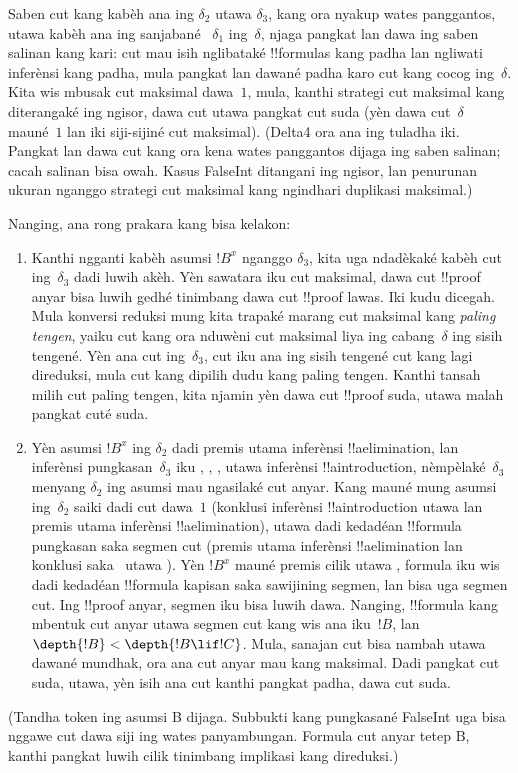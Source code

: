 \documentclass[../../../include/open-logic-section]{subfiles}
\begin{document}
Saben cut kang kabèh ana ing $\delta_2$ utawa $\delta_3$,
kang ora nyakup wates panggantos, utawa kabèh ana ing sanjabané
~$\delta_1$ ing~$\delta$, njaga pangkat lan dawa ing saben salinan kang kari:
cut mau isih nglibataké !!{formula}s kang padha lan ngliwati
inferènsi kang padha, mula pangkat lan dawané padha karo cut
kang cocog ing~$\delta$. Kita wis mbusak cut maksimal dawa~$1$,
mula, kanthi strategi cut maksimal kang diterangaké ing ngisor,
dawa cut utawa pangkat cut suda (yèn dawa cut~$\delta$
mauné~$1$ lan iki siji-sijiné cut maksimal).
(Delta4 ora ana ing tuladha iki. Pangkat lan dawa cut kang ora kena wates panggantos dijaga ing saben salinan; cacah salinan bisa owah. Kasus FalseInt ditangani ing ngisor, lan penurunan ukuran nganggo strategi cut maksimal kang ngindhari duplikasi maksimal.)

Nanging, ana rong prakara kang bisa kelakon:
\begin{enumerate}
  \item Kanthi ngganti kabèh asumsi $!B^x$ nganggo $\delta_3$,
  kita uga ndadèkaké kabèh cut ing~$\delta_3$ dadi luwih akèh.
  Yèn sawatara iku cut maksimal, dawa cut !!{proof} anyar bisa
  luwih gedhé tinimbang dawa cut !!{proof} lawas. Iki kudu
  dicegah. Mula konversi reduksi mung kita trapaké marang cut
  maksimal kang \emph{paling tengen}, yaiku cut kang ora nduwèni
  cut maksimal liya ing cabang~$\delta$ ing sisih tengené.
  Yèn ana cut ing~$\delta_3$, cut iku ana ing sisih tengené
  cut kang lagi direduksi, mula cut kang dipilih dudu kang paling
  tengen. Kanthi tansah milih cut paling tengen, kita njamin
  yèn dawa cut !!{proof} suda, utawa malah pangkat cuté suda.
  \item Yèn asumsi $!B^x$ ing $\delta_2$ dadi premis utama
  inferènsi !!a{elimination}, lan inferènsi pungkasan~$\delta_3$
  iku \Elim{\lor}, \Elim{\lexists}, \FalseInt, utawa inferènsi
  !!a{introduction}, nèmpèlaké~$\delta_3$ menyang $\delta_2$
  ing asumsi mau ngasilaké cut anyar. Kang mauné mung asumsi
  ing~$\delta_2$ saiki dadi cut dawa~$1$ (konklusi inferènsi
  !!a{introduction} utawa \FalseInt lan premis utama inferènsi
  !!a{elimination}), utawa dadi kedadéan !!{formula} pungkasan
  saka segmen cut (premis utama inferènsi !!a{elimination}
  lan konklusi saka~\Elim{\lor} utawa \Elim{\lexists}).
  Yèn $!B^x$ mauné premis cilik \Elim{\lor} utawa
  \Elim{\lexists}, formula iku wis dadi kedadéan !!{formula}
  kapisan saka sawijining segmen, lan bisa uga segmen cut.
  Ing !!{proof} anyar, segmen iku bisa luwih dawa. Nanging,
  !!{formula} kang mbentuk cut anyar utawa segmen cut kang wis
  ana iku~$!B$, lan $\depth{!B} < \depth{!B \lif !C}$.
  Mula, sanajan cut bisa nambah utawa dawané mundhak,
  ora ana cut anyar mau kang maksimal. Dadi pangkat cut suda,
  utawa, yèn isih ana cut kanthi pangkat padha, dawa cut suda.
\end{enumerate}
(Tandha token ing asumsi B dijaga. Subbukti kang pungkasané FalseInt uga bisa nggawe cut dawa siji ing wates panyambungan. Formula cut anyar tetep B, kanthi pangkat luwih cilik tinimbang implikasi kang direduksi.)
\end{document}
